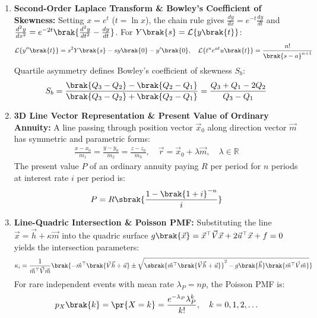 \begin{enumerate}[label=\thesubsection.\arabic*, ref=\thesubsection.\theenumi]
	\item \textbf{Second-Order Laplace Transform \& Bowley's Coefficient of Skewness:}
	Setting $x = e^t$ ($t = \ln x$), the chain rule gives $\frac{dy}{dx} = e^{-t}\frac{dy}{dt}$ and $\frac{d^2y}{dx^2} = e^{-2t}\brak{\frac{d^2y}{dt^2} - \frac{dy}{dt}}$. For $Y\brak{s} = \mathcal{L}\{y\brak{t}\}$:
	\begin{align}
		\mathcal{L}\{y''\brak{t}\} = s^2 Y\brak{s} - sy\brak{0} - y'\brak{0}, \quad \mathcal{L}\{t^n e^{at}u\brak{t}\} = \frac{n!}{\brak{s-a}^{n+1}} \label{eq:laplace_second_order}
	\end{align}
	Quartile asymmetry defines Bowley's coefficient of skewness $S_b$:
	\begin{align}
		S_b = \frac{\brak{Q_3 - Q_2} - \brak{Q_2 - Q_1}}{\brak{Q_3 - Q_2} + \brak{Q_2 - Q_1}} = \frac{Q_3 + Q_1 - 2Q_2}{Q_3 - Q_1} \label{eq:bowley_skewness}
	\end{align}
	
	\item \textbf{3D Line Vector Representation \& Present Value of Ordinary Annuity:}
	A line passing through position vector $\vec{x}_0$ along direction vector $\vec{m}$ has symmetric and parametric forms:
	\begin{align}
		\frac{x - x_0}{m_1} = \frac{y - y_0}{m_2} = \frac{z - z_0}{m_3}, \quad \vec{r} = \vec{x}_0 + \lambda\vec{m}, \quad \lambda \in \mathbb{R} \label{eq:line_3d_symmetric_vec}
	\end{align}
	The present value $P$ of an ordinary annuity paying $R$ per period for $n$ periods at interest rate $i$ per period is:
	\begin{align}
		P = R\sbrak{\frac{1 - \brak{1 + i}^{-n}}{i}} \label{eq:annuity_pv_formula}
	\end{align}
	
	\item \textbf{Line-Quadric Intersection \& Poisson PMF:}
	Substituting the line $\vec{x} = \vec{h} + \kappa\vec{m}$ into the quadric surface $g\brak{\vec{x}} = \vec{x}^{\top}\vec{V}\vec{x} + 2\vec{u}^{\top}\vec{x} + f = 0$ yields the intersection parameters:
	\begin{align}
		\kappa_i = \frac{1}{\vec{m}^{\top}\vec{V}\vec{m}}\brak{-\vec{m}^{\top}\brak{\vec{V}\vec{h} + \vec{u}} \pm \sqrt{\sbrak{\vec{m}^{\top}\brak{\vec{V}\vec{h} + \vec{u}}}^2 - g\brak{\vec{h}}\brak{\vec{m}^{\top}\vec{V}\vec{m}}}} \label{eq:line_conic_inter}
	\end{align}
	For rare independent events with mean rate $\lambda_P = np$, the Poisson PMF is:
	\begin{align}
		p_X\brak{k} = \pr{X = k} = \frac{e^{-\lambda_P}\lambda_P^k}{k!}, \quad k = 0, 1, 2, \dots \label{eq:poisson_pmf_formula}
	\end{align}
	

\end{enumerate}

